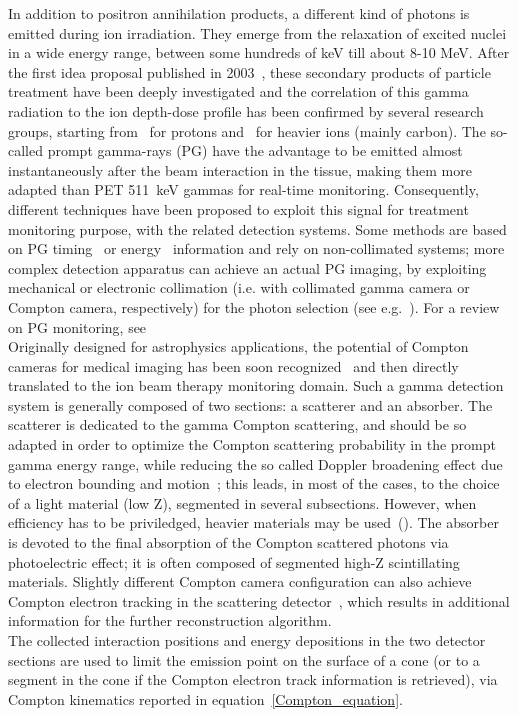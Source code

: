 In addition to positron annihilation products, a different kind of photons is emitted during ion irradiation. They emerge from the relaxation of excited nuclei in a wide energy range, between some hundreds of keV till about 8-10 MeV. After the first idea proposal published in 2003~\cite{PG_first}, these secondary products of particle treatment have been deeply investigated and the correlation of this gamma radiation to the ion depth-dose profile has been confirmed by several research groups, starting from~\cite{Min_PG} for protons and~\cite{Testa_PG} for heavier ions (mainly carbon). The so-called prompt gamma-rays (PG) have the advantage to be emitted almost instantaneously after the beam interaction in the tissue, making them more adapted than PET 511~keV gammas for real-time monitoring. Consequently, different techniques have been proposed to exploit this signal for treatment monitoring purpose, with the related detection systems. Some methods are based on PG timing~\cite{Golnik:2014aa, Krimmer_PGPI} or energy~\cite{Verburg:2014aa} information and rely on non-collimated systems; more complex detection apparatus can achieve an actual PG imaging, by exploiting mechanical or electronic collimation (i.e. with collimated gamma camera or Compton camera, respectively) for the photon selection (see e.g.~\cite{Min_PG, Bom_collimated, Smeets:2012aa, Roellinghoff_2014, Priegnitz:2015aa, Frandes_2010, LLOSA2012105, KORMOLL2011114, MCCLESKEY2015163, Matsuoka:2014qna, Peterson:2010aa, Solevi:2016aa, ALDAWOOD2017190}). For a review on PG monitoring, see~\cite{krimmer:hal-01585334}\\
Originally designed for astrophysics applications, the potential of Compton cameras for medical imaging has been soon recognized~\cite{TODD:1974aa} and then directly translated to the ion beam therapy monitoring domain. Such a gamma detection system is generally  composed of two sections: a scatterer and an absorber. The scatterer is dedicated to the gamma Compton scattering, and should be so adapted in order to optimize the Compton scattering probability in the prompt gamma energy range, while reducing the so called Doppler broadening effect due to electron bounding and motion~\cite{Doppler}; this leads, in most of the cases, to the choice of a light material (low Z), segmented in several subsections. However, when efficiency has to be priviledged, heavier materials may be used~(\cite{Solevi:2016aa, ALDAWOOD2017190, 0031-9155-60-18-7085}). The absorber is devoted to the final absorption of the Compton scattered photons via photoelectric effect; it is often composed of segmented high-Z scintillating materials. Slightly different Compton camera configuration can also achieve Compton electron tracking in the scattering detector~\cite{Frandes_2010, Yoshihara_ETCC}, which results in additional information for the further reconstruction algorithm.\\ The collected interaction positions and energy depositions in the two detector sections are used to limit the emission point on the surface of a cone (or to a segment in the cone if the Compton electron track information is retrieved), via Compton kinematics reported in equation~\ref{Compton_equation}.
